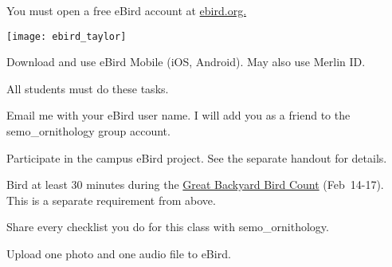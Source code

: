 \documentclass[t]{beamer}
\begin{document}
{
\begin{frame}{You must open a free eBird account at \href{https://ebird.org}{ebird.org.}}
	\vspace{-\baselineskip}
	\begin{center}
		\texttt{[image: ebird\_taylor]}
	\end{center}
	
	Download and use eBird Mobile (iOS, Android). May also use Merlin ID.
	
%	
\end{frame}
}

{
\begin{frame}{All students must do these tasks.}

\vspace{-\baselineskip}

\hangpara Email me with your eBird user name. I will add you as a friend to the semo\_ornithology group account.

\hangpara Participate in the campus eBird project. See the separate handout for details.

\hangpara Bird at least 30 minutes during the \href{https://www.birdcount.org/}{Great Backyard Bird Count} (Feb~14-17). This is a separate requirement from above.

\hangpara Share every checklist you do for this class with semo\_ornithology.

\hangpara Upload one photo and one audio file to eBird.

\hangpara \href{https://support.ebird.org/en/support/solutions/articles/48000795623-ebird-rules-and-best-practices}{}

\end{frame}
}
\end{document}

